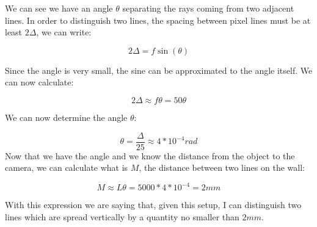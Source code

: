 We can see we have an angle \(\theta\) separating the rays coming from two adjacent lines. In order to distinguish two lines, the spacing between pixel lines must be at least \(2\Delta\), we can write:

\[
    2\Delta = f \sin(\theta)
\]

Since the angle is very small, the sine can be approximated to the angle itself. We can now calculate:

\[
    2\Delta \approx f\theta = 50\theta
\]

We can now determine the angle \(\theta\):

\[
    \theta = \frac{\Delta}{25} \approx 4 * 10^{-4} rad
\]
Now that we have the angle and we know the distance from the object to the camera, we can calculate what is $M$, the distance between two lines on the wall:

\[
    M \approx L\theta = 5000 * 4 * 10^{-4} = 2mm    
\]

With this expression we are saying that, given this setup, I can distinguish two lines which are spread vertically by a quantity no smaller than $2mm$.